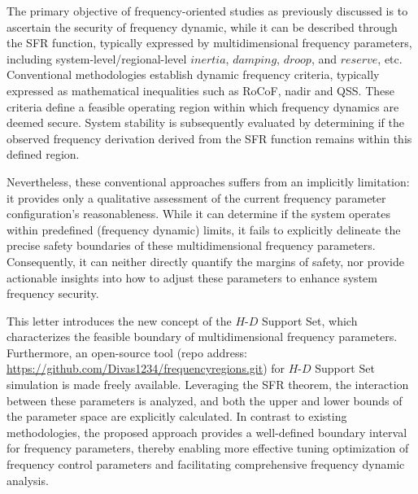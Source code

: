 \documentclass[lettersize,journal]{IEEEtran}
\begin{document}

The primary objective of frequency-oriented studies as previously discussed is to ascertain the security of frequency dynamic, while it can be described through the SFR function, typically expressed by multidimensional frequency parameters, including system-level/regional-level $inertia$, $damping$, $droop$, and $reserve$, etc. Conventional methodologies establish dynamic frequency criteria, typically expressed as mathematical inequalities such as RoCoF, nadir and QSS. These criteria define a feasible operating region within which frequency dynamics are deemed secure. System stability is subsequently evaluated by determining if the observed frequency derivation derived from the SFR function remains within this defined region.

Nevertheless, these conventional approaches suffers from an implicitly limitation: it provides only a qualitative assessment of the current frequency parameter configuration's reasonableness. While it can determine if the system operates within predefined (frequency dynamic) limits, it fails to explicitly delineate the precise safety boundaries of these multidimensional frequency parameters. Consequently, it can neither directly quantify the margins of safety, nor provide actionable insights into how to adjust these parameters to enhance system frequency security.


This letter introduces the new concept of the $H$-$D$ Support Set, which characterizes the feasible boundary of multidimensional frequency parameters. Furthermore, an open-source tool (repo address: \url{https://github.com/Divas1234/frequencyregions.git}) for $H$-$D$ Support Set simulation is made freely available. Leveraging the SFR theorem, the interaction between these parameters is analyzed, and both the upper and lower bounds of the parameter space are explicitly calculated. In contrast to existing methodologies, the proposed approach provides a well-defined boundary interval for frequency parameters, thereby enabling more effective tuning optimization of frequency control parameters and facilitating comprehensive frequency dynamic analysis.
\end{document}
